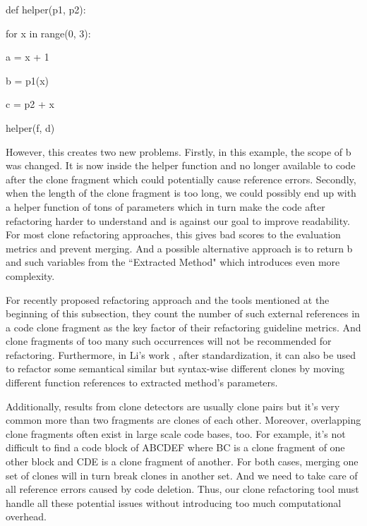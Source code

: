 \documentclass{acm_proc_article-sp}
\begin{document}
\IncMargin{1em}
\begin{algorithm}
	def helper(p1, p2):
	
		\Indp for x in range(0, 3):
		
			\Indp a = x + 1
			
			b = p1(x)
			
			c = p2 + x
			
		\Indm \Indm helper(f, d)
	
\end{algorithm}
\DecMargin{1em}

However, this creates two new problems. Firstly, in this example, the scope of b was changed. It is now inside the helper function and no longer available to code after the clone fragment
which could potentially cause reference errors. Secondly, when the length of the clone fragment is too long, we could possibly end up with a helper function of tons of parameters
which in turn make the code after refactoring harder to understand and is against our goal to improve readability. 
For most clone refactoring approaches, this gives bad scores to the evaluation metrics and prevent merging. And a possible alternative approach
is to return b and such variables from the ``Extracted Method" which introduces even more complexity.

For recently proposed refactoring approach \cite{li} and the tools mentioned at the beginning of this subsection, they count the number of such external references
in a code clone fragment as the key factor of their refactoring guideline metrics. 
And clone fragments of too many such occurrences will not be recommended for refactoring.
Furthermore, in Li's work \cite{li}, after standardization, it can also be used to refactor some semantical
similar but syntax-wise different clones by moving different function references to extracted method's parameters.

Additionally, results from clone detectors are usually clone pairs but it's very common 
more than two fragments are clones of each other. Moreover, overlapping clone fragments often
exist in large scale code bases, too. For example, it's not difficult to find a code block of ABCDEF where BC is a clone fragment of one other block and CDE is a clone fragment of another. For both cases, merging one set of clones will in turn break clones in another set. 
And we need to take care of all reference errors caused by code deletion. 
Thus, our clone refactoring tool must handle all these potential issues without
introducing too much computational overhead.
\end{document}
